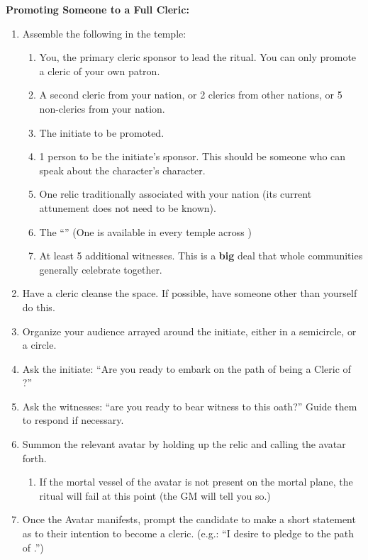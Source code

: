 \documentclass[green]{GL2020}
\begin{document}
\textbf{Promoting Someone to a Full Cleric:}
  \begin{enumerate}
    \item Assemble the following in the temple:
    \begin{enumerate}
      \item You, the primary cleric sponsor to lead the ritual. You can only promote a cleric of your own patron.
      \item A second cleric from your nation, or  2 clerics from other nations, or 5 non-clerics from your nation.
      \item The initiate to be promoted.
      \item 1 person to be the initiate’s sponsor. This should be someone who can speak about the character’s character.
      \item One relic traditionally associated with your nation (its current attunement does not need to be known).
      \item The ``\iOakStaff{}'' (One is available in every temple across \pEarth{})
      \item At least 5 additional witnesses. This is a \textbf{big} deal that whole communities generally celebrate together.
    \end{enumerate}
    \item Have a cleric cleanse the space. If possible, have someone other than yourself do this.
    \item Organize your audience arrayed around the initiate, either in a semicircle, or a circle.
    \item Ask the initiate: ``Are you ready to embark on the path of being a Cleric of \cFarmGod{}?''
    \item Ask the witnesses: ``are you ready to bear witness to this oath?'' Guide them to respond if necessary.
    \item Summon the relevant avatar by holding up the relic and calling the avatar forth.
    \begin{enumerate}
      \item If the mortal vessel of the avatar is not present on the mortal plane, the ritual will fail at this point (the GM will tell you so.)
    \end{enumerate}
    \item Once the Avatar manifests, prompt the candidate to make a short statement as to their intention to become a cleric. (e.g.: ``I desire to pledge to the path of \cFarmGod{}.'')
    \begin{enumerate}

\end{enumerate}
\end{enumerate}
\end{document}
